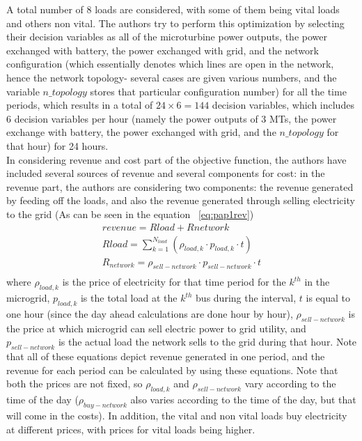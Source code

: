 A total number of 8 loads are considered, with some of them being vital loads and others non vital. The authors try to perform this optimization by selecting their decision variables as all of the microturbine power outputs, the power exchanged with battery, the power exchanged with grid, and the network configuration (which essentially denotes which lines are open in the network, hence the network topology- several cases are given various numbers, and the variable $n\_topology$ stores that particular configuration number) for all the time periods, which results in a total of $24\times6=144$ decision variables, which includes 6 decision variables per hour (namely the power outputs of 3 MTs, the power exchange with battery, the power exchanged with grid, and the $n\_topology$ for that hour) for 24 hours.\\
In considering revenue and cost part of the objective function, the authors have included several sources of revenue and several components for cost: in the revenue part, the authors are considering two components: the revenue generated by feeding off the loads, and also the revenue generated through selling electricity to the grid (As can be seen in the equation ~\eqref{eq:pap1rev})
\begin{eqnarray}
\label{eq:pap1rev}	
revenue = R{load} + R{network}\\
R{load} = \sum\limits_{k=1}^{N_{load}}(\rho_{load,k}\cdot p_{load,k}\cdot t)\\
R_{network} = \rho_{sell-network}\cdot p_{sell-network}\cdotp t\\
\end{eqnarray}
where $\rho_{load,k}$ is the price of electricity for that time period for the $k^{th}$ in the microgrid, $p_{load,k}$ is the total load at the $k^{th}$ bus during the  interval, $t$ is equal to one hour (since the day ahead calculations are done hour by hour), $\rho_{sell-network}$ is the price at which microgrid can sell electric power to grid utility, and $ p_{sell-network}$ is the actual load the network sells to the grid during that hour. Note that all of these equations depict revenue generated in one period, and the revenue for each period can be calculated by using these equations. Note that both the prices are not fixed, so $\rho_{load,k}$ and $ \rho_{sell-network}$ vary according to the time of the day ($\rho_{buy-network}$ also varies according to the time of the day, but that will come in the costs). In addition, the vital and non vital loads buy electricity at different prices, with prices for vital loads being higher.\\
